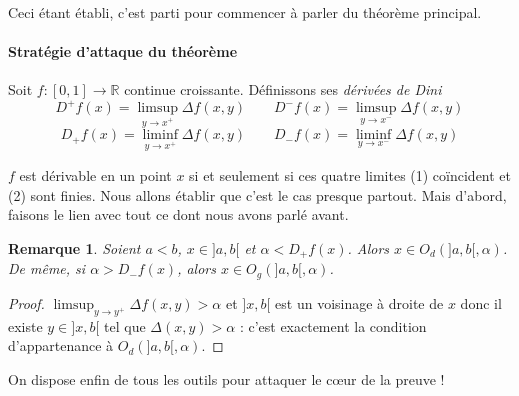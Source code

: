 \documentclass[a4paper, 11pt]{article}
\def\R{\mathbb{R}}
\newtheorem*{remark}{Remarque}
\begin{document}
Ceci étant établi, c'est parti pour commencer à parler du théorème principal.

\paragraph{Stratégie d'attaque du théorème}
Soit $f : [0,1] \to \R$ continue croissante.
Définissons ses \emph{dérivées de Dini}
\[ D^+f(x) = \limsup_{y \to x^+} \Delta f(x,y) \qquad
  D^-f(x) = \limsup_{y \to x^-} \Delta f(x,y) \]
\[  D_+f(x) = \liminf_{y \to x^+} \Delta f(x,y) \qquad
  D_-f(x) = \liminf_{y \to x^-} \Delta f(x,y) \]

$f$ est dérivable en un point $x$ si et seulement si ces quatre limites (1)
coïncident et (2) sont finies. Nous allons établir que c'est le cas presque
partout. Mais d'abord, faisons le lien avec tout ce dont nous avons parlé avant.

\begin{remark}
  Soient $a < b$, $x \in ]a,b[$ et $\alpha < D_+f(x)$. Alors $x \in O_d(]a,b[,
  \alpha)$. De même, si $\alpha > D_-f(x)$, alors $x \in O_g(]a,b[, \alpha)$.
\end{remark}
\begin{proof}
  $\limsup_{y \to y^+} \Delta f(x,y) > \alpha$ et $]x,b[$ est un voisinage à
  droite de $x$ donc il existe $y \in ]x,b[$ tel que $\Delta(x,y) > \alpha$ :
  c'est exactement la condition d'appartenance à $O_d(]a,b[,\alpha)$.
\end{proof}

On dispose enfin de tous les outils pour attaquer le cœur de la preuve !
\end{document}
